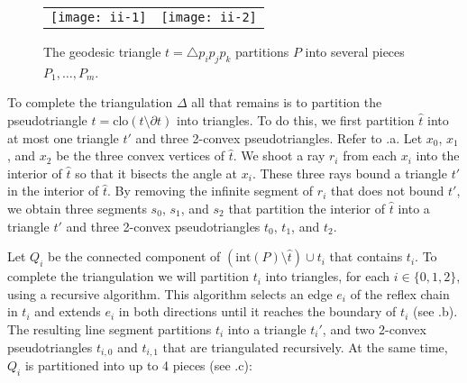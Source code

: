 \documentclass[lotsofwhite]{patmorin}
\newcommand{\boundary}{\partial}
\newcommand{\closure}{\mathrm{clo}}
\newcommand{\interior}{\mathrm{int}}
\newcommand{\z}[1]{{\hat{#1}}}
\begin{document}
\begin{figure}
  \begin{center}
    \begin{tabular}{cc}
      \texttt{[image: ii-1]} & \texttt{[image: ii-2]} 
    \end{tabular}
  \end{center}
  \caption{The geodesic triangle $t=\triangle p_i p_j p_k$ partitions $P$ into several
pieces $P_1,\ldots,P_m$.}
\end{figure}

To complete the triangulation $\Delta$ all that remains is to partition
the pseudotriangle $\z t=\closure(t\setminus \boundary t)$ into triangles.
To do this, we first partition $\z t$ into at most one triangle $t'$
and three 2-convex pseudotriangles. Refer to .a. Let
$x_0$, $x_1$, and $x_2$ be the three convex vertices of $\z t$.  We shoot
a ray $r_i$ from each $x_i$ into the interior of $\z t$ so that it
bisects the angle at $x_i$.  These three rays bound a triangle $t'$
in the interior of $\z t$. By removing the infinite segment of $r_i$
that does not bound $t'$, we obtain three segments $s_0$, $s_1$, and
$s_2$ that partition the interior of $\z t$ into a triangle $t'$ and
three 2-convex pseudotriangles $t_0$, $t_1$, and $t_2$.

Let $Q_i$ be the connected component of $(\interior(P)\setminus
\z t)\cup t_i$ that contains $t_i$.  To complete the triangulation
we will partition $t_i$ into triangles, for each $i\in\{0,1,2\}$,
using a recursive algorithm.  This algorithm selects an edge $e_i$
of the reflex chain in $t_i$ and extends $e_i$ in both directions
until it reaches the boundary of $t_i$ (see .b).
The resulting line segment partitions $t_i$ into a triangle $t_i'$, and
two 2-convex pseudotriangles $t_{i,0}$ and $t_{i,1}$ that are triangulated
recursively.  At the same time, $Q_i$ is partitioned into up to 4 pieces
(see .c):
\end{document}
